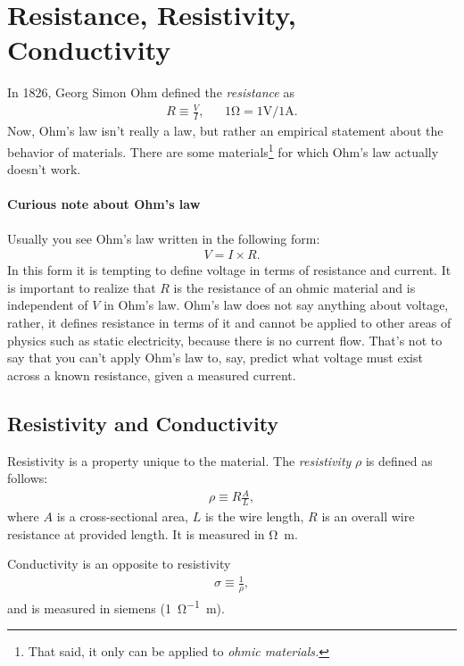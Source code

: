 \documentclass[../../document]{subfiles}
\begin{document}
\section{Resistance, Resistivity, Conductivity}
In 1826, Georg Simon Ohm defined the \emph{resistance} as 
\begin{align}
	R \equiv \frac{V}{I}, && 1\unit{\ohm}=1\unit{\volt}/1\unit{\ampere}.
\end{align}
Now, Ohm’s law isn’t really a law, but rather an empirical statement about the
behavior of materials. There are some materials\footnote{That said, it only can
be applied to \emph{ohmic materials.}} for which Ohm’s law actually doesn’t
work. \cite{practical_electronics}

\paragraph*{Curious note about Ohm’s law}
Usually you see Ohm’s law written in the following form:
\begin{gather}
	V=I\times R.
\end{gather}
In this form it is tempting to define voltage in terms of resistance and
current. It is important to realize that \(R\) is the resistance of an ohmic
material and is independent of \(V\)  in Ohm’s law. Ohm’s law does not say
anything about voltage, rather, it defines resistance in terms of it and cannot
be applied to other areas of physics such as static electricity, because there
is no current flow. That’s not to say that you can’t apply Ohm’s law to, say,
predict what voltage must exist across a known resistance, given a measured
current. \cite[p. 24]{practical_electronics}

\subsection{Resistivity and Conductivity}
Resistivity is a property unique to the material. The \emph{resistivity}
\(\rho\) is defined as follows:
\begin{gather}
	\rho\equiv R\frac{A}{L},
\end{gather}
where \(A\) is a cross-sectional area, \(L\) is the wire length, \(R\) is an
overall wire resistance at provided length. It is measured in
\unit{\ohm\meter}. \cite{practical_electronics}

Conductivity is an opposite to resistivity
\begin{gather}
	\sigma\equiv \frac{1}{\rho},
\end{gather}
and is measured in siemens (\unit{1\per\ohm\meter}). \cite{practical_electronics}
\end{document}
